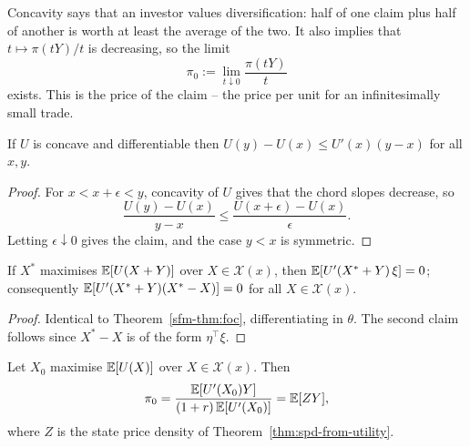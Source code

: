 \documentclass[a4paper]{scrartcl}
\begin{document}
Concavity says that an investor values diversification: half of one claim plus half of another is worth at least the average of the two. It also implies that $t \mapsto \pi(tY)/t$ is decreasing, so the limit
$$
\pi_0 := \lim_{t\downarrow 0}\frac{\pi(tY)}{t}
$$
exists. This is the  price of the claim -- the price per unit for an infinitesimally small trade.

\begin{lemma}\label{lem:supporting}
	If $U$ is concave and differentiable then $U(y) - U(x) \leq U'(x)(y-x)$ for all $x,y$.
\end{lemma}

\begin{proof}
	For $x < x + \epsilon < y$, concavity of $U$ gives that the chord slopes decrease, so
	$$
	\frac{U(y)-U(x)}{y-x} \leq \frac{U(x+\epsilon)-U(x)}{\epsilon}.
	$$
	Letting $\epsilon \downarrow 0$ gives the claim, and the case $y < x$ is symmetric.
\end{proof}

\begin{lemma}\label{lem:foc-with-claim}
	If $X^*$ maximises $\mathbb{E}[U(X+Y)]$ over $X \in \mathcal{X}(x)$, then $\mathbb{E}[U'(X^*+Y)\,\xi] = 0$; consequently $\mathbb{E}[U'(X^*+Y)(X^* - X)] = 0$ for all $X \in \mathcal{X}(x)$.
\end{lemma}

\begin{proof}
	Identical to Theorem~\ref{sfm-thm:foc}, differentiating in $\theta$. The second claim follows since $X^* - X$ is of the form $\eta^\top\xi$.
\end{proof}

\begin{theorem}\label{thm:marginal}
	Let $X_0$ maximise $\mathbb{E}[U(X)]$ over $X \in \mathcal{X}(x)$. Then
	$$
	\pi_0 = \frac{\mathbb{E}[U'(X_0)Y]}{(1+r)\,\mathbb{E}[U'(X_0)]} = \mathbb{E}[ZY],
	$$
	where $Z$ is the state price density of Theorem~\ref{thm:spd-from-utility}.
\end{theorem}
\end{document}
